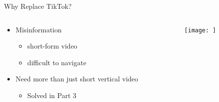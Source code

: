 \documentclass[aspectratio=169]{beamer}
\begin{document}
\begin{frame}{Why Replace TikTok?}
\begin{columns}[T]
    \begin{column}[T]{0.5\textwidth}
        \begin{itemize}
            \item Misinformation
            \begin{itemize}
                \item short-form video
                \item difficult to navigate
            \end{itemize}
            \item Need more than just short vertical video
            \begin{itemize}
                \item Solved in Part 3
            \end{itemize}
        \end{itemize}
    \end{column}
    \begin{column}{0.5\textwidth}
        \texttt{[image: ]}
    \end{column}
\end{columns}
\end{frame}
\end{document}
